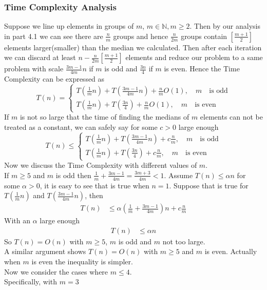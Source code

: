 \documentclass[12pt,letterpaper]{article}
\begin{document}
\subsubsection{Time Complexity Analysis}
Suppose we line up elements in groups of $m$, $m\in\mathbb{N},m\geq 2$. Then by our analysis in part 4.1 we can see there are $\frac{n}{m}$ groups and hence $\frac{n}{2m}$ groups contain $\left[\frac{m+1}{2}\right]$ elements larger(smaller) than the median we calculated. Then after each iteration we can discard at least $n-\frac{n}{2m}\left[\frac{m+1}{2}\right]$ elements and reduce our problem to a same problem with scale $\frac{3m-1}{4m}n$ if $m$ is odd and $\frac{3n}{4}$ if $m$ is even. Hence the Time Complexity can be expressed as 
$$T(n)=\begin{cases}
    T(\frac{1}{m}n)+T(\frac{3m-1}{4m}n)+\frac{n}{m}O(1),\quad m \quad\text{is odd}\\
    T(\frac{1}{m}n)+T(\frac{3n}{4})+\frac{n}{m}O(1),\quad m \quad \text{is even}
\end{cases}$$
If $m$ is not so large that the time of finding the medians of $m$ elements can not be treated as a constant, we can safely say for some $c>0$ large enough
$$T(n)\leq \begin{cases}
    T(\frac{1}{m}n)+T(\frac{3m-1}{4m}n)+c\frac{n}{m},\quad m \quad\text{is odd}\\
    T(\frac{1}{m}n)+T(\frac{3n}{4})+c\frac{n}{m},\quad m \quad \text{is even}
\end{cases}$$
Now we discuss the Time Complexity with different values of $m$.\\
If $m\geq 5$ and $m$ is odd then $\frac{1}{m}+\frac{3m-1}{4m}=\frac{3m+3}{4m}<1$. Assume $T(n)\leq\alpha n$ for some $\alpha>0$, it is easy to see that is true when $n=1$. Suppose that is true for $T(\frac{1}{m}n)$ and $T(\frac{3m-1}{4m}n)$, then 
\begin{align}
    T(n)&\leq \alpha\left(\frac{1}{m}+\frac{3m-1}{4m}\right)n+c\frac{n}{m}
\end{align} 
With an $\alpha$ large enough
\begin{align}
    T(n)&\leq \alpha n
\end{align}
So $T(n)=O(n)$ with $m\geq 5$, $m$ is odd and $m$ not too large. \\
A similar argument shows $T(n)=O(n)$ with $m\geq 5$ and $m$ is even. Actually when $m$ is even the inequality is simpler.\\
Now we consider the cases where $m\leq 4$.\\
Specifically, with $m=3$
\end{document}
